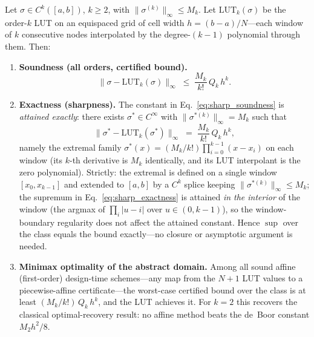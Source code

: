 \setcounter{theorem}{8}
\begin{theorem}
\label{thm:sharp-lut}
Let $\sigma \in C^k([a,b])$, $k \geq 2$, with $\|\sigma^{(k)}\|_\infty \leq M_k$.
Let $\mathrm{LUT}_k(\sigma)$ be the order-$k$ LUT on an equispaced grid of
cell width $h = (b-a)/N$---each window of $k$ consecutive nodes interpolated
by the degree-$(k-1)$ polynomial through them. Then:

\begin{enumerate}
    \item \textbf{Soundness (all orders, certified bound).}
    \begin{equation}
    \|\sigma - \mathrm{LUT}_k(\sigma)\|_\infty
    \;\leq\; \frac{M_k}{k!}\, Q_k\, h^k.
    \label{eq:sharp_soundness}
    \end{equation}

    \item \textbf{Exactness (sharpness).} The constant in
    Eq.~\eqref{eq:sharp_soundness} is \emph{attained exactly}: there exists
    $\sigma^{*} \in C^\infty$ with $\|\sigma^{*(k)}\|_\infty = M_k$ such that
    \begin{equation}
    \|\sigma^{*} - \mathrm{LUT}_k(\sigma^{*})\|_\infty
    \;=\; \frac{M_k}{k!}\, Q_k\, h^k,
    \label{eq:sharp_exactness}
    \end{equation}
    namely the extremal family
    $\sigma^{*}(x) = (M_k/k!) \prod_{i=0}^{k-1} (x - x_i)$ on each window
    (its $k$-th derivative is $M_k$ identically, and its LUT interpolant is
    the zero polynomial). Strictly: the extremal is defined on a single
    window $[x_0, x_{k-1}]$ and extended to $[a,b]$ by a $C^k$ splice
    keeping $\|\sigma^{*(k)}\|_\infty \leq M_k$; the supremum in
    Eq.~\eqref{eq:sharp_exactness} is attained \emph{in the interior} of
    the window (the argmax of $\prod_i |u-i|$ over $u \in (0, k-1)$), so
    the window-boundary regularity does not affect the attained constant.
    Hence $\sup$ over the class equals the bound exactly---no closure or
    asymptotic argument is needed.

    \item \textbf{Minimax optimality of the abstract domain.} Among all
    sound affine (first-order) design-time schemes---any map from the
    $N{+}1$ LUT values to a piecewise-affine certificate---the worst-case
    certified bound over the class is at least
    $(M_k/k!)\,Q_k\,h^k$, and the LUT achieves it. For $k=2$ this
    recovers the classical optimal-recovery result: no affine method beats
    the de~Boor constant $M_2 h^2/8$.
\end{enumerate}
\end{theorem}

